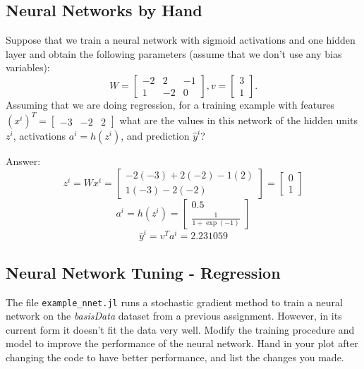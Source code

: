 \documentclass{article}
\def\ans#1{\par\gre{Answer: #1}}
\def\blu#1{{\color{blu}#1}}
\def\gre#1{{\color{gre}#1}}
\newcommand{\mat}[1]{\begin{bmatrix}#1\end{bmatrix}}
\begin{document}
\subsection{Neural Networks by Hand}

Suppose that we train a neural network with sigmoid activations and one hidden layer and obtain the following parameters (assume that we don't use any bias variables):
\[
W = \mat{-2 & 2 & -1\\1 & -2 & 0}, v = \mat{3 \\1}.
\]
Assuming that we are doing regression, \blu{for a training example with features $(x^i)^T = \mat{-3 &-2 & 2}$ what are the values in this network of the hidden units $z^i$, activations $a^i = h(z^i)$, and prediction $\hat{y}^i$?}
\ans{
\[z^i=Wx^i=\mat{-2(-3)+2(-2)-1(2) \\ 1(-3)-2(-2)}
=\mat{0 \\ 1}\]
\[a^i=h(z^i)=\mat{0.5 \\ \frac{1}{1+\exp(-1)}}\]
\[\hat{y}^i=v^T a^i = 2.231059\]
}

\pagebreak

\subsection{Neural Network Tuning - Regression}

The file \texttt{example\_nnet.jl} runs a stochastic gradient method to train a neural network on the \emph{basisData} dataset from a previous assignment. However, in its current form it doesn't fit the data very well. Modify the training procedure and model to improve the performance of the neural network. \blu{Hand in your plot after changing the code to have better performance, and list the changes you made}.
\end{document}
